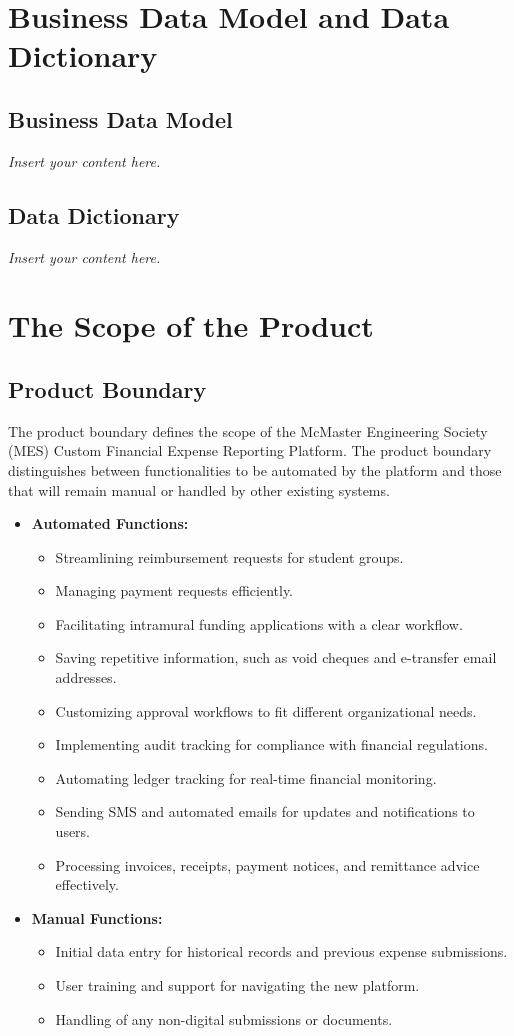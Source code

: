 \documentclass[12pt]{article}
\newcommand{\lips}{\textit{Insert your content here.}}
\begin{document}
\section{Business Data Model and Data Dictionary}
\subsection{Business Data Model}
\lips
\subsection{Data Dictionary}
\lips

\section{The Scope of the Product}

\subsection{Product Boundary}
The product boundary defines the scope of the McMaster Engineering Society (MES) Custom Financial Expense Reporting Platform. The product boundary distinguishes between functionalities to be automated by the platform and those that will remain manual or handled by other existing systems.

\begin{itemize}
    \item \textbf{Automated Functions:}
    \begin{itemize}
        \item Streamlining reimbursement requests for student groups.
        \item Managing payment requests efficiently.
        \item Facilitating intramural funding applications with a clear workflow.
        \item Saving repetitive information, such as void cheques and e-transfer email addresses.
        \item Customizing approval workflows to fit different organizational needs.
        \item Implementing audit tracking for compliance with financial regulations.
        \item Automating ledger tracking for real-time financial monitoring.
        \item Sending SMS and automated emails for updates and notifications to users.
        \item Processing invoices, receipts, payment notices, and remittance advice effectively.
    \end{itemize}
    \item \textbf{Manual Functions:}
    \begin{itemize}
        \item Initial data entry for historical records and previous expense submissions.
        \item User training and support for navigating the new platform.
        \item Handling of any non-digital submissions or documents.
    \end{itemize}
\end{itemize}
\end{document}
